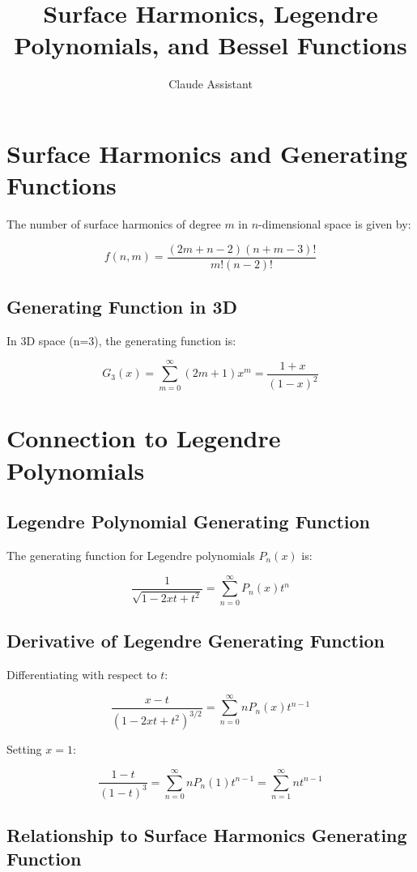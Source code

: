 \documentclass{article}
\title{Surface Harmonics, Legendre Polynomials, and Bessel Functions}
\author{Claude Assistant}
\date{}
\begin{document}
\maketitle

\section{Surface Harmonics and Generating Functions}

The number of surface harmonics of degree $m$ in $n$-dimensional space is given by:

\[f(n,m) = \frac{(2m+n-2)(n+m-3)!}{m!(n-2)!}\]

\subsection{Generating Function in 3D}

In 3D space (n=3), the generating function is:

\[G_3(x) = \sum_{m=0}^{\infty} (2m+1)x^m = \frac{1+x}{(1-x)^2}\]

\section{Connection to Legendre Polynomials}

\subsection{Legendre Polynomial Generating Function}

The generating function for Legendre polynomials $P_n(x)$ is:

\[\frac{1}{\sqrt{1-2xt+t^2}} = \sum_{n=0}^{\infty} P_n(x)t^n\]

\subsection{Derivative of Legendre Generating Function}

Differentiating with respect to $t$:

\[\frac{x-t}{(1-2xt+t^2)^{3/2}} = \sum_{n=0}^{\infty} nP_n(x)t^{n-1}\]

Setting $x=1$:

\[\frac{1-t}{(1-t)^3} = \sum_{n=0}^{\infty} nP_n(1)t^{n-1} = \sum_{n=1}^{\infty} nt^{n-1}\]

\subsection{Relationship to Surface Harmonics Generating Function}
\end{document}
